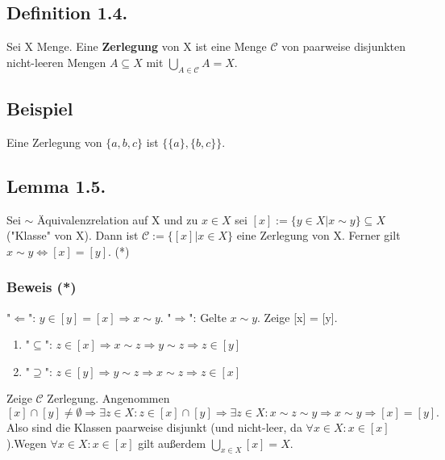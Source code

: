 \documentclass {article}
\begin{document}
\subsection*{Definition 1.4.}
Sei X Menge. Eine \textbf{Zerlegung} von X ist eine Menge $\mathcal{C}$ von paarweise disjunkten nicht-leeren Mengen $A \subseteq X$ mit $\bigcup_{A \in \mathcal{C}} A = X$.

\subsection*{Beispiel}
Eine Zerlegung von $\{ a, b, c\}$ ist $\{\{ a\}, \{ b, c\}\}$.

\subsection*{Lemma 1.5.}
Sei $\sim$ Äquivalenzrelation auf X und zu $x \in X$ sei $[x] := \{y \in X | x \sim y\} \subseteq X$ ("Klasse" von X).\newline
Dann ist $\mathcal{C} := \{[x] | x \in X\}$ eine Zerlegung von X.\newline
Ferner gilt $x \sim y \Leftrightarrow [x] =  [y]$. (*)\newline
\subsubsection*{Beweis (*)}
"$\Leftarrow$": $y \in [y] = [x] \Rightarrow x \sim y$.\newline
"$\Rightarrow$": Gelte $x \sim y$. Zeige [x] = [y].
\begin{enumerate}
\item "$\subseteq$": $z \in [x] \Rightarrow x \sim z \Rightarrow y \sim z \Rightarrow z \in [y]$
\item "$\supseteq$": $z \in [y] \Rightarrow y \sim z \Rightarrow x \sim z \Rightarrow z \in [x]$\newline
\end{enumerate}
Zeige $\mathcal{C}$ Zerlegung.\newline
Angenommen $[x] \cap [y] \neq \emptyset \Rightarrow \exists z \in X: z \in [x] \cap [y] \Rightarrow \exists z \in X: x \sim z \sim y \Rightarrow x \sim y \Rightarrow [x] = [y].$\newline Also sind die Klassen paarweise disjunkt (und nicht-leer, da $\forall x \in X: x \in [x]$).\newline Wegen $\forall x \in X: x \in [x]$ gilt außerdem $\bigcup_{x \in X} [x] = X$.
\end{document}
